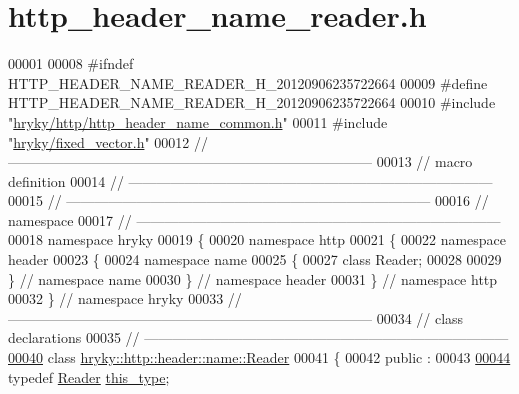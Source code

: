\hypertarget{http__header__name__reader_8h_source}{\section{http\-\_\-header\-\_\-name\-\_\-reader.\-h}
}

\begin{DoxyCode}
00001 
00008 \textcolor{preprocessor}{#ifndef HTTP\_HEADER\_NAME\_READER\_H\_20120906235722664}
00009 \textcolor{preprocessor}{}\textcolor{preprocessor}{#define HTTP\_HEADER\_NAME\_READER\_H\_20120906235722664}
00010 \textcolor{preprocessor}{}\textcolor{preprocessor}{#include "\hyperlink{http__header__name__common_8h}{hryky/http/http_header_name_common.h}"}
00011 \textcolor{preprocessor}{#include "\hyperlink{fixed__vector_8h}{hryky/fixed_vector.h}"}
00012 \textcolor{comment}{//
      ------------------------------------------------------------------------------}
00013 \textcolor{comment}{// macro definition}
00014 \textcolor{comment}{//
      ------------------------------------------------------------------------------}
00015 \textcolor{comment}{//
      ------------------------------------------------------------------------------}
00016 \textcolor{comment}{// namespace}
00017 \textcolor{comment}{//
      ------------------------------------------------------------------------------}
00018 \textcolor{keyword}{namespace }hryky
00019 \{
00020 \textcolor{keyword}{namespace }http
00021 \{
00022 \textcolor{keyword}{namespace }header
00023 \{
00024 \textcolor{keyword}{namespace }name
00025 \{
00027     \textcolor{keyword}{class }Reader;
00028 
00029 \} \textcolor{comment}{// namespace name}
00030 \} \textcolor{comment}{// namespace header}
00031 \} \textcolor{comment}{// namespace http}
00032 \} \textcolor{comment}{// namespace hryky}
00033 \textcolor{comment}{//
      ------------------------------------------------------------------------------}
00034 \textcolor{comment}{// class declarations}
00035 \textcolor{comment}{//
      ------------------------------------------------------------------------------}
\hypertarget{http__header__name__reader_8h_source_l00040}{}\hyperlink{classhryky_1_1http_1_1header_1_1name_1_1_reader}{00040} \textcolor{comment}{}\textcolor{keyword}{class }\hyperlink{classhryky_1_1http_1_1header_1_1name_1_1_reader}{hryky::http::header::name::Reader}
00041 \{
00042 \textcolor{keyword}{public} :
00043 
\hypertarget{http__header__name__reader_8h_source_l00044}{}\hyperlink{classhryky_1_1http_1_1header_1_1name_1_1_reader_ace8bca464723d7ca1460bd39c59fe2e6}{00044}     \textcolor{keyword}{typedef} \hyperlink{classhryky_1_1http_1_1header_1_1name_1_1_reader}{Reader} \hyperlink{classhryky_1_1http_1_1header_1_1name_1_1_reader_ace8bca464723d7ca1460bd39c59fe2e6}{this_type};

\end{DoxyCode}
